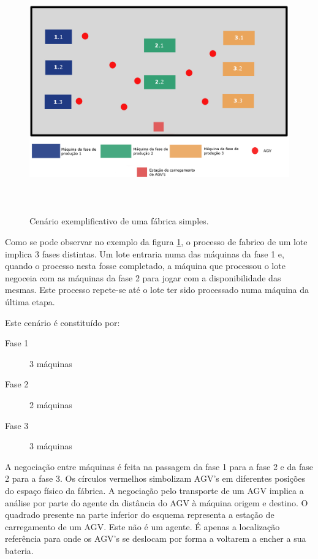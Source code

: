\begin{titlepage}
\begin{figure}[H]
  \centering
    \includegraphics[width=18cm, height = 10.5cm]{scenario.png}
  \caption{Cenário exemplificativo de uma fábrica simples.}
  \label{scenario}
\end{figure}

Como se pode observar no exemplo da figura \ref{scenario}, o processo de fabrico de um lote implica 3 fases distintas. Um lote entraria numa das máquinas da fase 1 e, quando o processo nesta fosse completado, a máquina que processou o lote negoceia com as máquinas da fase 2 para jogar com a disponibilidade das mesmas. Este processo repete-se até o lote ter sido processado numa máquina da última etapa. 

\newpage
Este cenário é constituído por:

\begin{description}
\item[Fase 1] 3 máquinas
\item[Fase 2] 2 máquinas 
\item[Fase 3] 3 máquinas
\end{description}

A negociação entre máquinas é feita na passagem da fase 1 para a fase 2 e da fase 2 para a fase 3. Os círculos vermelhos simbolizam AGV's em diferentes posições do espaço físico da fábrica. A negociação pelo transporte de um AGV implica a análise por parte do agente da distância do AGV à máquina origem e destino. O quadrado presente na parte inferior do esquema representa a estação de carregamento de um AGV. Este não é um agente. É apenas a localização referência para onde os AGV's se deslocam por forma a voltarem a encher a sua bateria.


\end{titlepage}
